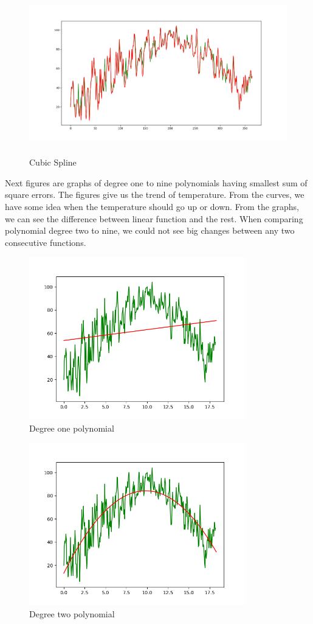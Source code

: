 \documentclass{article}
\begin{document}
\begin{figure}[H]
    \centering
    \includegraphics[height=200pt]{cubic_spline_270.png}
    \caption{Cubic Spline}
    \label{cubic spline}
\end{figure}
Next figures are graphs of degree one to nine polynomials having smallest sum of square errors. The figures give us the trend of temperature. From the curves, we have some idea when the temperature should go up or down. From the graphs, we can see the difference between linear function and the rest. When comparing polynomial degree two to nine, we could not see big changes between any two consecutive functions. \\
\begin{figure}[H]
    \centering
    \includegraphics[height=200pt]{1poly_270.png}
    \caption{Degree one polynomial}
\end{figure}
\begin{figure}[H]
    \centering
    \includegraphics[height=200pt]{2poly_270.png}
    \caption{Degree two polynomial}
\end{figure}
\end{document}
